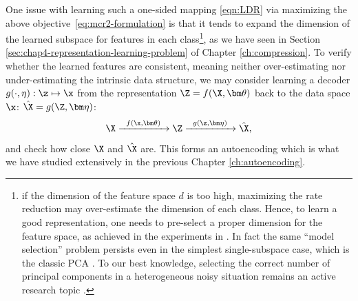 \documentclass[../../book-main.tex]{subfiles}
\begin{document}
{One issue with learning such a one-sided mapping \eqref{eqn:LDR} via  maximizing the above \mbox{objective \eqref{eq:mcr2-formulation}} is that it tends to expand the dimension of the learned subspace for features in each class\footnote{if the dimension of the feature space $d$ is too high, maximizing the rate reduction may over-estimate the dimension of each class. Hence, to learn a good representation, one needs to pre-select a proper dimension for the feature space, as achieved in the experiments in \cite{yu2020learning}. In fact the same ``model selection'' problem persists even in the simplest single-subspace case, which is the classic PCA \cite{Jolliffe1986}. To our best knowledge, selecting the correct number of principal components in a heterogeneous noisy situation remains an active research topic \cite{hong2020selecting}.}, as we have seen in Section \ref{sec:chap4-representation-learning-problem} of Chapter \ref{ch:compression}. To verify whether the learned features are consistent, meaning neither over-estimating nor under-estimating the intrinsic data structure, we may consider learning a decoder $g(\cdot,\eta): \z \mapsto  \x$ from the representation $\Z = f(\X,\bm\theta)$ back to the data space $\x$: $\hat \X = g(\Z, \bm\eta)$:
\begin{equation}
    \X \xrightarrow{\hspace{2mm} f(\x, \bm\theta)\hspace{2mm}} \Z \xrightarrow{\hspace{2mm} g(\z, \bm \eta) \hspace{2mm}} \hat \X, 
    \label{eqn:autoencoding-ch6}
\end{equation}
and check how close $\X$ and $\hat \X$ are. This forms an autoencoding which is  what we have studied extensively in the previous Chapter \ref{ch:autoencoding}.

}
\end{document}
